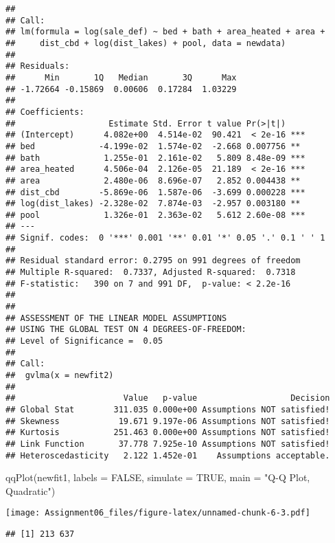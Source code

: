 \documentclass[
]{article}
\newenvironment{Shaded}{\begin{snugshade}}{\end{snugshade}}
\newcommand{\AttributeTok}[1]{\textcolor[rgb]{0.77,0.63,0.00}{#1}}
\newcommand{\ConstantTok}[1]{\textcolor[rgb]{0.00,0.00,0.00}{#1}}
\newcommand{\FunctionTok}[1]{\textcolor[rgb]{0.00,0.00,0.00}{#1}}
\newcommand{\NormalTok}[1]{#1}
\newcommand{\StringTok}[1]{\textcolor[rgb]{0.31,0.60,0.02}{#1}}
\begin{document}
\begin{verbatim}
## 
## Call:
## lm(formula = log(sale_def) ~ bed + bath + area_heated + area + 
##     dist_cbd + log(dist_lakes) + pool, data = newdata)
## 
## Residuals:
##      Min       1Q   Median       3Q      Max 
## -1.72664 -0.15869  0.00606  0.17284  1.03229 
## 
## Coefficients:
##                   Estimate Std. Error t value Pr(>|t|)    
## (Intercept)      4.082e+00  4.514e-02  90.421  < 2e-16 ***
## bed             -4.199e-02  1.574e-02  -2.668 0.007756 ** 
## bath             1.255e-01  2.161e-02   5.809 8.48e-09 ***
## area_heated      4.506e-04  2.126e-05  21.189  < 2e-16 ***
## area             2.480e-06  8.696e-07   2.852 0.004438 ** 
## dist_cbd        -5.869e-06  1.587e-06  -3.699 0.000228 ***
## log(dist_lakes) -2.328e-02  7.874e-03  -2.957 0.003180 ** 
## pool             1.326e-01  2.363e-02   5.612 2.60e-08 ***
## ---
## Signif. codes:  0 '***' 0.001 '**' 0.01 '*' 0.05 '.' 0.1 ' ' 1
## 
## Residual standard error: 0.2795 on 991 degrees of freedom
## Multiple R-squared:  0.7337, Adjusted R-squared:  0.7318 
## F-statistic:   390 on 7 and 991 DF,  p-value: < 2.2e-16
## 
## 
## ASSESSMENT OF THE LINEAR MODEL ASSUMPTIONS
## USING THE GLOBAL TEST ON 4 DEGREES-OF-FREEDOM:
## Level of Significance =  0.05 
## 
## Call:
##  gvlma(x = newfit2) 
## 
##                      Value   p-value                   Decision
## Global Stat        311.035 0.000e+00 Assumptions NOT satisfied!
## Skewness            19.671 9.197e-06 Assumptions NOT satisfied!
## Kurtosis           251.463 0.000e+00 Assumptions NOT satisfied!
## Link Function       37.778 7.925e-10 Assumptions NOT satisfied!
## Heteroscedasticity   2.122 1.452e-01    Assumptions acceptable.
\end{verbatim}

\begin{Shaded}
\begin{Highlighting}[]
\FunctionTok{qqPlot}\NormalTok{(newfit1, }\AttributeTok{labels =} \ConstantTok{FALSE}\NormalTok{, }\AttributeTok{simulate =} \ConstantTok{TRUE}\NormalTok{, }\AttributeTok{main =} \StringTok{"Q{-}Q Plot, Quadratic"}\NormalTok{)}
\end{Highlighting}
\end{Shaded}

\texttt{[image: Assignment06\_files/figure-latex/unnamed-chunk-6-3.pdf]}

\begin{verbatim}
## [1] 213 637
\end{verbatim}
\end{document}
